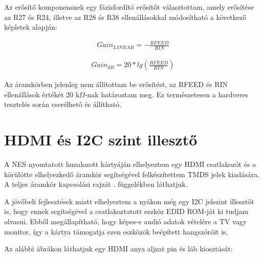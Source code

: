 	Az erősítő komponensnek egy fázisfordító erősítőt választottam, amely erősítése az R27 és R24, illetve az R28 és R38 ellenállásokkal módosítható a következő képletek alapján:
	
	\begin{align}	
		Gain_{LINEAR} = -\frac{RFEED}{RIN}
	\end{align} 
	
	\begin{align}	
		Gain_{dB} = 20 * lg(\frac{RFEED}{RIN})
	\end{align}
 
	Az áramkörben jelenleg nem állítottam be erősítést, az RFEED és RIN ellenállások értékét 20 k$\Omega$-nak határoztam meg. Ez természetesen a hardveres tesztelés során cserélhető és állítható.	
	
\section{HDMI és I2C szint illesztő}
	\label{sec:HMI-I2C}
	
	A NES nyomtatott huzalozott kártyáján elhelyeztem egy HDMI csatlakozót és a körülötte elhelyezkedő áramkör segítségével felkészítettem TMDS jelek kiadására. A teljes áramkör kapcsolási rajzát . függelékben láthatjuk.
	
	A jövőbeli fejlesztések miatt elhelyeztem a nyákon még egy I2C jelszint illesztőt is, hogy ennek segítségével a csatlakoztatott eszköz EDID ROM-ját ki tudjam olvasni. Ebből megállapítható, hogy képes-e audió adatok vételére a TV vagy monitor, így a kártya támogatja ezen eszközök beépített hangszóróit is. 
	
	Az alábbi ábrákon láthatjuk egy HDMI anya aljzat pin és láb kiosztását:   
	
